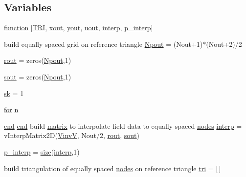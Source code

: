 \subsection*{Variables}
\begin{DoxyCompactItemize}
\item 
\hyperlink{a00563_a8acf1654b3cf5e5e470e3de2050c8a88}{function} \mbox{[}\hyperlink{a00563_a558baeb50ad046e899b5e64f957b043f}{T\+RI}, \hyperlink{a00563_aa43b7c30923e8fcf939fe12082a19359}{xout}, \hyperlink{a00563_a440aa7a05dec25dc6fe586eaa162395b}{yout}, \hyperlink{a00563_a5c8d8342682becd112eb9de226d6053f}{uout}, \hyperlink{a00563_a7626c967b638c3cc70c7c96863cbd07f}{interp}, \hyperlink{a00563_a08a5429e87fabfe926dd685750b12894}{p\+\_\+interp}\mbox{]}
\item 
build equally spaced grid on reference triangle \hyperlink{a00563_a75cc3e159d58012abe41092c5a0d5707}{Npout} = (Nout+1)$\ast$(Nout+2)/2
\item 
\hyperlink{a00563_a2428903c9f57e3eba1ab8aa2ea4ad70b}{rout} = zeros(\hyperlink{a00563_a75cc3e159d58012abe41092c5a0d5707}{Npout},1)
\item 
\hyperlink{a00563_a2e91fc640c0a9feaa4cd6fa858ba430b}{sout} = zeros(\hyperlink{a00563_a75cc3e159d58012abe41092c5a0d5707}{Npout},1)
\item 
\hyperlink{a00563_ad95e1f06b6be929c6b670b2a9a80d5cc}{sk} = 1
\item 
\hyperlink{a00623_ad1e7380d51df1e0043d24d3c8a860e0a}{for} \hyperlink{a00563_a4c2d80ab32fc3a598413ae25e9f2bdce}{n}
\item 
\hyperlink{a00608_afb358f48b1646c750fb9da6c6585be2b}{end} \hyperlink{a00608_afb358f48b1646c750fb9da6c6585be2b}{end} build \hyperlink{a01014_af07ff1035f34d77764ff516f110e6832}{matrix} to interpolate field data to equally spaced \hyperlink{a00608_a9fd973fb7dcbed4123ae5eb2f3868e61}{nodes} \hyperlink{a00563_a7626c967b638c3cc70c7c96863cbd07f}{interp} = v\+Interp\+Matrix2D(\hyperlink{a00473_a8ef32285093ff36729ef70bb1e8149c4}{VinvV}, Nout/2, \hyperlink{a00563_a2428903c9f57e3eba1ab8aa2ea4ad70b}{rout}, \hyperlink{a00563_af37c7e7d7baefebf97f9b18e437d3a0b}{sout})
\item 
\hyperlink{a00563_a08a5429e87fabfe926dd685750b12894}{p\+\_\+interp} = \hyperlink{a00611_ad6cb0afbbe6ea4f56407890be2533966}{size}(\hyperlink{a00563_a7626c967b638c3cc70c7c96863cbd07f}{interp},1)
\item 
build triangulation of equally spaced \hyperlink{a00608_a9fd973fb7dcbed4123ae5eb2f3868e61}{nodes} on reference triangle \hyperlink{a00563_aa0c5dcb80b0d73954cf3cba7bb428081}{tri} = \mbox{[}$\,$\mbox{]}

\end{DoxyCompactItemize}
